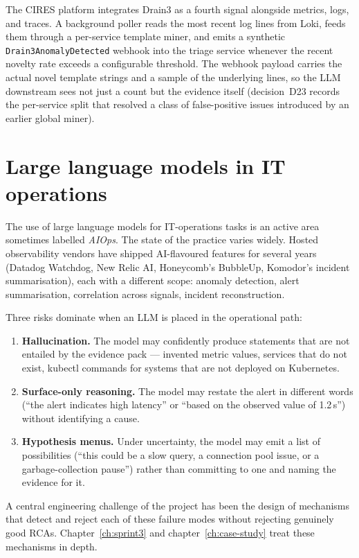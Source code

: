 \documentclass[11pt,a4paper,oneside]{report}
\begin{document}
The CIRES platform integrates Drain3 as a fourth signal alongside
metrics, logs, and traces.  A background poller reads the most recent
log lines from Loki, feeds them through a per-service template miner,
and emits a synthetic \texttt{Drain3AnomalyDetected} webhook into the
triage service whenever the recent novelty rate exceeds a configurable
threshold.  The webhook payload carries the actual novel template
strings and a sample of the underlying lines, so the LLM downstream
sees not just a count but the evidence itself
(decision~D23 records the per-service split that resolved a class of
false-positive issues introduced by an earlier global miner).

\section{Large language models in IT operations}

The use of large language models for IT-operations tasks is an active
area sometimes labelled \emph{AIOps}.  The state of the practice
varies widely.  Hosted observability vendors have shipped AI-flavoured
features for several years (Datadog Watchdog, New Relic AI,
Honeycomb's BubbleUp, Komodor's incident summarisation), each with a
different scope: anomaly detection, alert summarisation, correlation
across signals, incident reconstruction.

Three risks dominate when an LLM is placed in the operational path:

\begin{enumerate}
  \item \textbf{Hallucination.}  The model may confidently produce
        statements that are not entailed by the evidence pack ---
        invented metric values, services that do not exist, kubectl
        commands for systems that are not deployed on Kubernetes.
  \item \textbf{Surface-only reasoning.}  The model may restate the
        alert in different words (``the alert indicates high latency''
        or ``based on the observed value of 1.2\,s'') without
        identifying a cause.
  \item \textbf{Hypothesis menus.}  Under uncertainty, the model may
        emit a list of possibilities (``this could be a slow query,
        a connection pool issue, or a garbage-collection pause'')
        rather than committing to one and naming the evidence for it.
\end{enumerate}

A central engineering challenge of the project has been the design
of mechanisms that detect and reject each of these failure modes
without rejecting genuinely good RCAs.  Chapter~\ref{ch:sprint3} and
chapter~\ref{ch:case-study} treat these mechanisms in depth.
\end{document}
